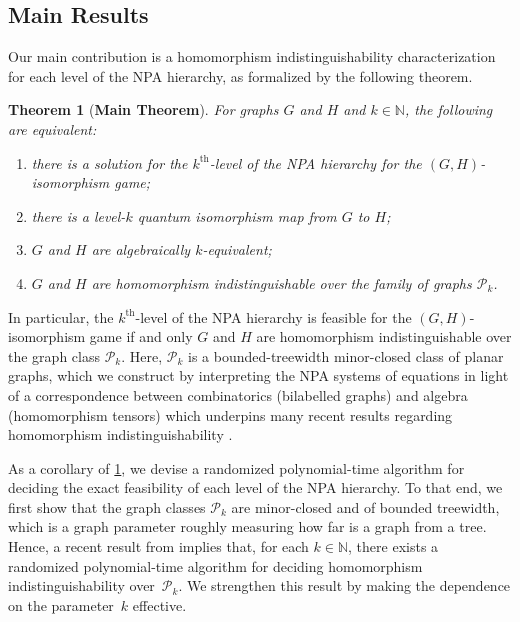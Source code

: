 \documentclass[11pt,a4paper]{article}
\theoremstyle{plain}
\newtheorem{thm}{Theorem}[section]
\theoremstyle{remark}
\theoremstyle{definition}
\def\calP{{\mathcal P}} \def\calQ{{\mathcal Q}} \def\calR{{\mathcal R}}
\begin{document}
\subsection{Main Results}

Our main contribution is a homomorphism indistinguishability characterization for each level of the NPA hierarchy, as formalized by the following theorem.
\begin{thm}[\textbf{Main Theorem}]\label{thm:main-theorem}
    For graphs $G$ and $H$ and $k \in \mathbb{N}$, the following are equivalent:
    \begin{enumerate}[label = (\roman*)]
        \item there is a solution for the $k^{\text{th}}$-level of the NPA hierarchy for the $(G,H)$-isomorphism game;
        \item there is a level-$k$ quantum isomorphism map from $G$ to $H$;\label{ref1}
        \item $G$ and $H$ are algebraically $k$-equivalent;\label{ref2}
        \item $G$ and $H$ are homomorphism indistinguishable over the family of graphs $\calP_k$. 
    \end{enumerate}
\end{thm}
In particular, the $k^{\text{th}}$-level of the NPA hierarchy is feasible for the $(G,H)$-isomorphism game if and only $G$ and $H$ are homomorphism indistinguishable over the graph class $\calP_k$. 
Here, $\mathcal{P}_k$ is a bounded-treewidth minor-closed class of planar graphs, which we construct by interpreting the NPA systems of equations in light of a correspondence between combinatorics (bilabelled graphs) and algebra (homomorphism tensors) which underpins many recent results regarding homomorphism indistinguishability \cite{david-laura,grohe_homomorphism_2022,rattan_weisfeiler_2023,roberson-seppelt-arxiv}.

As a corollary of \cref{thm:main-theorem}, we devise
a randomized polynomial-time algorithm for deciding the exact feasibility of each level of the NPA hierarchy.
To that end, we first show that the graph classes $\calP_k$ are minor-closed and of bounded treewidth, which is a graph parameter roughly measuring how far is a graph from a tree.
Hence, a recent result from \cite{seppelt_algorithmic_2024} implies that, for each $k \in \mathbb{N}$, there exists a randomized polynomial-time algorithm for deciding homomorphism indistinguishability over~$\mathcal{P}_k$.
We strengthen this result by making the dependence on the parameter~$k$ effective.
\end{document}
